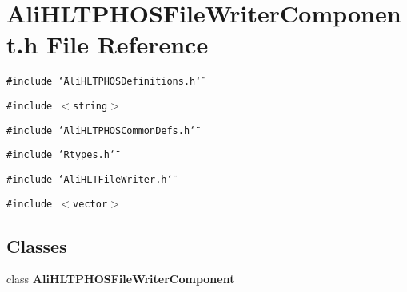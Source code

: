 \section{Ali\-HLTPHOSFile\-Writer\-Component.h File Reference}
\label{AliHLTPHOSFileWriterComponent_8h}


{\tt \#include \char`\"{}Ali\-HLTPHOSDefinitions.h\char`\"{}}\par
{\tt \#include $<$string$>$}\par
{\tt \#include \char`\"{}Ali\-HLTPHOSCommon\-Defs.h\char`\"{}}\par
{\tt \#include \char`\"{}Rtypes.h\char`\"{}}\par
{\tt \#include \char`\"{}Ali\-HLTFile\-Writer.h\char`\"{}}\par
{\tt \#include $<$vector$>$}\par
\subsection*{Classes}
\begin{CompactItemize}
\item 
class {\bf Ali\-HLTPHOSFile\-Writer\-Component}
\end{CompactItemize}
